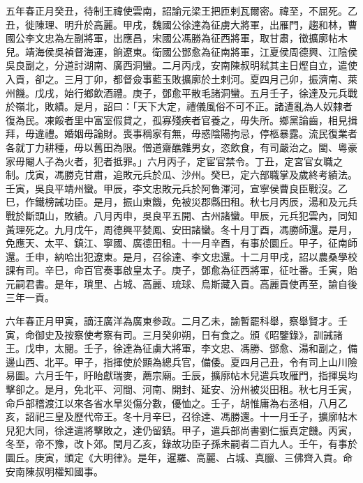 \begin{pinyinscope}
五年春正月癸丑，待制王禕使雲南，詔諭元梁王把匝剌瓦爾密。禕至，不屈死。乙丑，徙陳理、明升於高麗。甲戌，魏國公徐達為征虜大將軍，出雁門，趨和林，曹國公李文忠為左副將軍，出應昌，宋國公馮勝為征西將軍，取甘肅，徵擴廓帖木兒。靖海侯吳禎督海運，餉遼東。衛國公鄧愈為征南將軍，江夏侯周德興、江陰侯吳良副之，分道討湖南、廣西洞蠻。二月丙戌，安南陳叔明弒其主日熞自立，遣使入貢，卻之。三月丁卯，都督僉事藍玉敗擴廓於土剌河。夏四月己卯，振濟南、萊州饑。戊戌，始行鄉飲酒禮。庚子，鄧愈平散毛諸洞蠻。五月壬子，徐達及元兵戰於嶺北，敗績。是月，詔曰：「天下大定，禮儀風俗不可不正。諸遭亂為人奴隸者復為民。凍餒者里中富室假貸之，孤寡殘疾者官養之，毋失所。鄉黨論齒，相見揖拜，毋違禮。婚姻毋論財。喪事稱家有無，毋惑陰陽拘忌，停柩暴露。流民復業者各就丁力耕種，毋以舊田為限。僧道齋醮雜男女，恣飲食，有司嚴治之。閩、粵豪家毋閹人子為火者，犯者抵罪。」六月丙子，定宦官禁令。丁丑，定宮官女職之制。戊寅，馮勝克甘肅，追敗元兵於瓜、沙州。癸巳，定六部職掌及歲終考績法。壬寅，吳良平靖州蠻。甲辰，李文忠敗元兵於阿魯渾河，宣寧侯曹良臣戰沒。乙巳，作鐵榜誡功臣。是月，振山東饑，免被災郡縣田租。秋七月丙辰，湯和及元兵戰於斷頭山，敗績。八月丙申，吳良平五開、古州諸蠻。甲辰，元兵犯雲內，同知黃理死之。九月戊午，周德興平婪鳳、安田諸蠻。冬十月丁酉，馮勝師還。是月，免應天、太平、鎮江、寧國、廣德田租。十一月辛酉，有事於圜丘。甲子，征南師還。壬申，納哈出犯遼東。是月，召徐達、李文忠還。十二月甲戌，詔以農桑學校課有司。辛巳，命百官奏事啟皇太子。庚子，鄧愈為征西將軍，征吐番。壬寅，貽元嗣君書。是年，瑣里、占城、高麗、琉球、烏斯藏入貢。高麗貢使再至，諭自後三年一貢。

六年春正月甲寅，謫汪廣洋為廣東參政。二月乙未，諭暫罷科舉，察舉賢才。壬寅，命御史及按察使考察有司。三月癸卯朔，日有食之。頒《昭鑒錄》，訓誡諸王。戊申，太閱。壬子，徐達為征虜大將軍，李文忠、馮勝、鄧愈、湯和副之，備邊山西、北平。甲子，指揮使於顯為總兵官，備倭。夏四月己丑，令有司上山川險易圖。六月壬午，盱眙獻瑞麥，薦宗廟。壬辰，擴廓帖木兒遣兵攻雁門，指揮吳均擊卻之。是月，免北平、河間、河南、開封、延安、汾州被災田租。秋七月壬寅，命戶部稽渡江以來各省水旱災傷分數，優恤之。壬子，胡惟庸為右丞相，八月乙亥，詔祀三皇及歷代帝王。冬十月辛巳，召徐達、馮勝還。十一月壬子，擴廓帖木兒犯大同，徐達遣將擊敗之，達仍留鎮。甲子，遣兵部尚書劉仁振真定饑。丙寅，冬至，帝不豫，改卜郊。閏月乙亥，錄故功臣子孫未嗣者二百九人。壬午，有事於圜丘。庚寅，頒定《大明律》。是年，暹羅、高麗、占城、真臘、三佛齊入貢。命安南陳叔明權知國事。


\end{pinyinscope}
